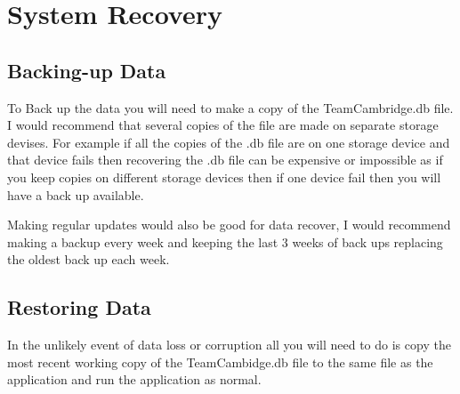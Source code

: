 \section{System Recovery}

\subsection{Backing-up Data}
To Back up the data you will need to make a copy of the TeamCambridge.db file. I would recommend that several copies of the file are made on separate storage devises. For example if all the copies of the .db file are on one storage device and that device fails then recovering the .db file can be expensive or impossible as if you keep copies on different storage devices then if one device fail then you will have a back up available.

Making regular updates would also be good for data recover, I would recommend making a backup every week and keeping the last 3 weeks of back ups replacing the oldest back up each week. 
\subsection{Restoring Data}
In the unlikely event of data loss or corruption all you will need to do is copy the most recent working copy of the TeamCambidge.db file to the same file as the application and run the application as normal.

\stopcontents[UserManual]

